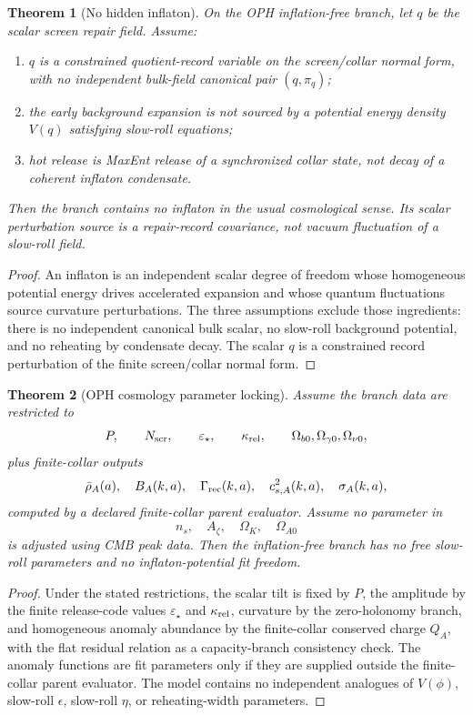 \documentclass[11pt]{article}
\newtheorem{theorem}{Theorem}[section]
\begin{document}
\begin{theorem}[No hidden inflaton]\label{thm:no-hidden-inflaton}
On the OPH inflation-free branch, let \(q\) be the scalar screen repair field. Assume:
\begin{enumerate}[leftmargin=2em]
\item \(q\) is a constrained quotient-record variable on the screen/collar normal form, with no
independent bulk-field canonical pair \((q,\pi_q)\);
\item the early background expansion is not sourced by a potential energy density \(V(q)\) satisfying
slow-roll equations;
\item hot release is MaxEnt release of a synchronized collar state, not decay of a coherent inflaton
condensate.
\end{enumerate}
Then the branch contains no inflaton in the usual cosmological sense. Its scalar perturbation source
is a repair-record covariance, not vacuum fluctuation of a slow-roll field.
\end{theorem}

\begin{proof}
An inflaton is an independent scalar degree of freedom whose homogeneous potential energy drives
accelerated expansion and whose quantum fluctuations source curvature perturbations. The three
assumptions exclude those ingredients: there is no independent canonical bulk scalar, no slow-roll
background potential, and no reheating by condensate decay. The scalar \(q\) is a constrained record
perturbation of the finite screen/collar normal form.
\end{proof}

\begin{theorem}[OPH cosmology parameter locking]\label{thm:parameter-locking}
Assume the branch data are restricted to
\[
P,\qquad
N_{\rm scr},\qquad
\varepsilon_\star,\qquad
\kappa_{\rm rel},\qquad
\Omega_{b0},\Omega_{\gamma0},\Omega_{\nu0},
\]
plus finite-collar outputs
\[
\bar\rho_A(a),\quad
B_A(k,a),\quad
\Gamma_{\rm rec}(k,a),\quad
c_{s,A}^2(k,a),\quad
\sigma_A(k,a),
\]
computed by a declared finite-collar parent evaluator. Assume no parameter in
\[
n_s,\quad A_\zeta,\quad \Omega_K,\quad \Omega_{A0}
\]
is adjusted using CMB peak data. Then the inflation-free branch has no free slow-roll parameters and
no inflaton-potential fit freedom.
\end{theorem}

\begin{proof}
Under the stated restrictions, the scalar tilt is fixed by \(P\), the amplitude by the finite
release-code values \(\varepsilon_\star\) and \(\kappa_{\rm rel}\), curvature by the zero-holonomy branch, and homogeneous
anomaly abundance by the finite-collar conserved charge \(Q_A\), with the flat residual relation as
a capacity-branch consistency check. The anomaly functions are fit parameters only if they are supplied
outside the finite-collar parent evaluator. The model contains no independent analogues of
\(V(\phi)\), slow-roll \(\epsilon\), slow-roll \(\eta\), or reheating-width parameters.
\end{proof}
\end{document}
